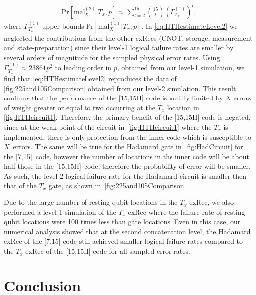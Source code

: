 \documentclass[pra,longbibliography,twocolumn,showpacs,nofootinbib,superscriptaddress,notitlepage]{revtex4-1}
\begin{document}
\begin{align}
\mathrm{Pr}[\mathrm{mal}^{(2)}_{X}|T_{x},p] \approx \sum_{l=2}^{15}\binom{15}{l} (\Gamma_{T_{x}}^{(1)})^{l},
\label{eq:HTHestimateLevel2}
\end{align}
where $\Gamma_{T_{x}}^{(1)}$ upper bounds $\mathrm{Pr}[\mathrm{mal}^{(1)}_{X}|T_{x},p]$. In \cref{eq:HTHestimateLevel2} we neglected the contributions from the other exRecs (CNOT, storage, measurement and state-preparation) since their level-1 logical failure rates are smaller by several orders of magnitude for the sampled physical error rates. Using $\Gamma_{T_{x}}^{(1)} \approx 23861p^{2}$ to leading order in $p$, obtained from our level-1 simulation, we find that \cref{eq:HTHestimateLevel2} reproduces the data of \cref{fig:225and105Comparison} obtained from our level-2 simulation. This result confirms that the performance of the [15,15H] code is mainly limited by $X$ errors of weight greater or equal to two occurring at the $T_{x}$ location in \cref{fig:HTHcircuit1}. Therefore, the primary benefit of the [15,15H] code is negated, since at the weak point of the circuit in~\cref{fig:HTHcircuit1} where the $T_x$ is implemented, there is only protection from the inner code which is susceptible to $X$~errors. The same will be true for the Hadamard gate in~\cref{fig:HadCircuit} for the [7,15]~code, however the number of locations in the inner code will be about half those in the [15,15H]~code, therefore the probability of error will be smaller. As such, the level-2 logical failure rate for the Hadamard circuit is smaller then that of the $T_x$ gate, as shown in~\cref{fig:225and105Comparison}.

Due to the large number of resting qubit locations in the $T_{x}$ exRec, we also performed a level-1 simulation of the $T_{x}$ exRec where the failure rate of resting qubit locations were 100 times less than gate locations. Even in this case, our numerical analysis showed that at the second concatenation level, the Hadamard exRec of the [7,15] code still achieved smaller logical failure rates compared to the $T_{x}$ exRec of the [15,15H] code for all sampled error rates.

\section{Conclusion}
\label{sec:Conclusion}
\end{document}
